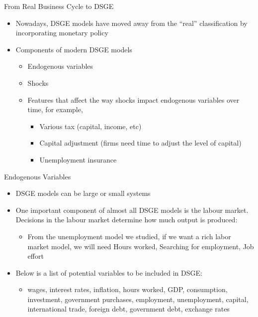\documentclass[aspectratio=1610]{beamer}
\begin{document}
\begin{frame}[wide]{From Real Business Cycle to DSGE}
	\begin{itemize}
		\item Nowadays, DSGE models have moved away from the “real” classification by incorporating monetary policy
		\item Components of modern DSGE models
		\begin{itemize}
			\item Endogenous variables
			\item Shocks
			\item Features that affect the way shocks impact endogenous variables over time, for example,
			\begin{itemize}
				\item Various tax (capital, income, etc)
				\item Capital adjustment (firms need time to adjust the level of capital)
				\item Unemployment insurance
			\end{itemize}
		\end{itemize}
		
	\end{itemize}
\end{frame}

\begin{frame}[wide]{Endogenous Variables}
	\begin{itemize}
		\item DSGE models can be large or small systems
		\item One important component of almost all DSGE models is the labour market. Decisions in the labour market determine how much output is produced:
		\begin{itemize}
			\item From the unemployment model we studied, if we want a rich labor market model, we will need Hours worked, Searching for employment, Job effort
		\end{itemize}
		\item Below is a list of potential variables to be included in DSGE:
		\begin{itemize}
			\item wages, interest rates, inflation, hours worked, GDP, consumption, investment, 	government purchases, employment, unemployment, capital, international trade, foreign debt, 	government debt, exchange rates
			
		\end{itemize}
	\end{itemize}
\end{frame}
\end{document}
